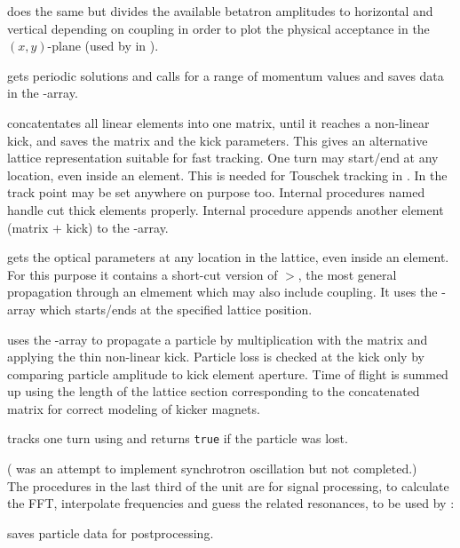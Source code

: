 \documentclass[12pt]{article}
\newcommand\code[1]{{\tt #1}}
\newcommand\guico[1]{{\color{blue}\code{#1}}}
\newcommand{\unico}[1]{{\color{burntorange}\code{#1}}}
\newcommand{\prcod}[2]{\opauni{#1}$>$\unico{#2}}
\newcommand{\opagui}[1]{\colorbox{blue!20}{{\color{black}\code{#1}}}}
\newcommand{\ogui}[1]{\hyperref[#1]{\opagui{#1}}}
\newcommand{\opauni}[1]{\colorbox{orange!30}{{\color{black}\code{#1}}}}
\newcommand{\todo}[1]{{\color{red} #1}}
\begin{document}
\unico{Ampkappa} does the same but divides the available betatron amplitudes to horizontal and vertical depending on coupling \cite{inside} in order to plot the physical acceptance in the $(x,y)$-plane (used by \guico{Silhouette} in \ogui{opatrackda}).

\unico{Acc\_dpp} gets periodic solutions and calls \unico{Acceptances} for a range of momentum values and saves data in the \unico{geodpp}-array.

\unico{TrackingMatrix} concatentates all linear elements into one matrix, until it reaches a non-linear kick, and saves the matrix and the kick parameters. This gives an alternative lattice representation suitable for fast tracking. One turn may start/end at any location, even inside an element. This is needed for Touschek tracking in \ogui{opatracktt}. In \ogui{opatrackps} the track point may be set anywhere on purpose too. Internal procedures named \unico{\dots Cut} handle cut thick elements properly. Internal procedure \unico{appendTMat} appends another element (matrix $+$ kick) to the \unico{TMat}-array.

\unico{TrackPoint} gets the optical parameters at any location in the lattice, even inside an element. For this purpose it contains a short-cut version of \prcod{elemlib}{MCC\_prop}, the most general propagation through an elmement which may also include coupling. It uses the \unico{TMat}-array which starts/ends at the specified lattice position.

\unico{TMatKick} uses the \unico{TMat}-array to propagate a particle by multiplication with the matrix and applying the thin non-linear kick. Particle loss is checked at the kick {\todo only} by comparing particle amplitude to kick element aperture. Time of flight is summed up using the length of the lattice section corresponding to the concatenated matrix for correct modeling of kicker magnets.

\unico{OneTurn} tracks one turn using \unico{TMatKick} and returns \code{true} if the particle was lost.

(\todo{\unico{OneTurn\_S} was an attempt to implement synchrotron oscillation but not completed.})\\[1ex]

The procedures in the last third of the unit are for signal processing, to calculate the FFT, interpolate frequencies and guess the related resonances, to be used by \ogui{opatrackps}:

\unico{savePStrackData} saves particle data for postprocessing.
\end{document}
